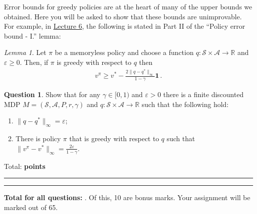 \documentclass{article}
\newcommand{\norm}[1]{\| #1 \|}
\renewcommand{\epsilon}{\varepsilon}
\newcommand{\R}{\mathbb{R}}
\DeclareMathOperator*{\1}{\mathbbm{1}}
\newcommand{\0}{\mathbf{0}}
\newcounter{DocPoints}
\newcounter{QuestionPoints}
\newcommand{\tpoints}[1]{        	\ifthenelse{\isempty{#1}}	{	}	{		\addtocounter{DocPoints}{#1}
		\addtocounter{QuestionPoints}{#1}
	}													 	\par\mbox{}\par\noindent\hfill {Total: \bf \arabic{QuestionPoints}\xspace points}\par\mbox{}\par\hrule\hrule
	\setcounter{QuestionPoints}{0}
}
\theoremstyle{definition}
\newtheorem{question}{Question}
\theoremstyle{remark}
\newtheorem{lemma}{Lemma}
\newcommand{\cS}{\mathcal{S}}
\newcommand{\cA}{\mathcal{A}}
\begin{document}
Error bounds for greedy policies are at the heart of many of the upper bounds we obtained.
Here you will be asked to show that these bounds are unimprovable.
For example, in
\href{http://rltheory.github.io/lecture-notes/planning-in-mdps/lec6/}{Lecture 6},
the following is stated in
Part II of the ``Policy error bound - I.'' lemma:
\begin{lemma}
Let $\pi$ be a memoryless policy and choose a function $q:\mathcal{S}\times\mathcal{A} \to \mathbb{R}$ and $\epsilon\ge 0$. Then,
if $\pi$ is greedy with respect to $q$ then
\begin{align*}
v^\pi \ge v^* - \frac{2\|q-q^*\|_\infty}{1-\gamma} \boldsymbol{1}\,.
\end{align*}
\end{lemma}
\begin{question}
Show that for any $\gamma\in [0,1)$ and $\varepsilon>0$ there is a finite
discounted MDP $M=(\cS,\cA,P,r,\gamma)$ and $q:\cS \times \cA \to \R$ such that the following hold:
\begin{enumerate}
\item $\norm{q-q^*}_\infty  =\varepsilon$;
\item There is policy $\pi$ that is greedy with respect to $q$ such that $\|v^\pi-v^*\|_\infty = \frac{2\varepsilon}{1-\gamma}$.
\end{enumerate}
\tpoints{10}
\end{question}



\bigskip
\bigskip

\noindent
\textbf{
Total for all questions: }.
Of this, 10 are bonus marks. 
Your assignment will be marked out of 65.
\end{document}
